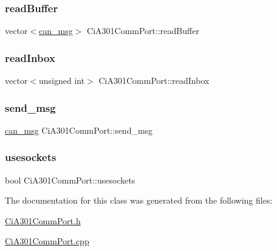 \subsubsection{\texorpdfstring{read\+Buffer}{readBuffer}}
{\footnotesize\ttfamily vector$<$\hyperlink{structcan__msg}{can\+\_\+msg}$>$ Ci\+A301\+Comm\+Port\+::read\+Buffer\hspace{0.3cm}{\ttfamily [private]}}

\mbox{\label{classCiA301CommPort_a41b2fcb24a27e5280417db03d8cdb399}} 
\subsubsection{\texorpdfstring{read\+Inbox}{readInbox}}
{\footnotesize\ttfamily vector$<$unsigned int$>$ Ci\+A301\+Comm\+Port\+::read\+Inbox\hspace{0.3cm}{\ttfamily [private]}}

\mbox{\label{classCiA301CommPort_ade81ac897a5d851d946dd7a18245b75d}} 
\subsubsection{\texorpdfstring{send\+\_\+msg}{send\_msg}}
{\footnotesize\ttfamily \hyperlink{structcan__msg}{can\+\_\+msg} Ci\+A301\+Comm\+Port\+::send\+\_\+msg\hspace{0.3cm}{\ttfamily [private]}}

\mbox{\label{classCiA301CommPort_a579e0de814111bde3bbe18cceb76ce64}} 
\subsubsection{\texorpdfstring{usesockets}{usesockets}}
{\footnotesize\ttfamily bool Ci\+A301\+Comm\+Port\+::usesockets\hspace{0.3cm}{\ttfamily [private]}}



The documentation for this class was generated from the following files\+:\begin{DoxyCompactItemize}
\item 
\hyperlink{CiA301CommPort_8h}{Ci\+A301\+Comm\+Port.\+h}\item 
\hyperlink{CiA301CommPort_8cpp}{Ci\+A301\+Comm\+Port.\+cpp}\end{DoxyCompactItemize}
